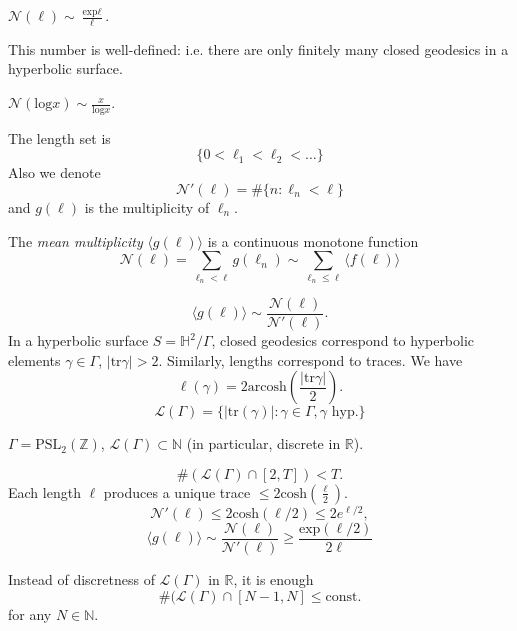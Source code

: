 \begin{theorem}
\label{theorem-huber-selberg}
$\mathcal{N}(\ell)
\sim \frac{\text{exp}\ell}{\ell}$.
\end{theorem}

\noindent
This number is well-defined: i.e.
there are only finitely many closed
geodesics in a hyperbolic surface.

\begin{remark}
\label{remark-nlog}
$\mathcal{N}(\text{log} x)
\sim \frac{x}{\text{log} x}$.
\end{remark}

\noindent
The length set is
$$
\{0<\ell_1<\ell_2<…\}
$$
Also we denote
$$
\mathcal{N}'(\ell)
=\#\{n : \ell_n <\ell\}
$$
and $g(\ell)$ is the multiplicity of
$\ell_n$.

\begin{definition}
\label{definition-mean-multiplicity}
The {\it mean multiplicity} 
$\langle g(\ell)\rangle$ is a continuous
monotone function
$$
\mathcal{N}(\ell)
=\sum_{\ell_n<\ell}g(\ell_n)
\sim
\sum_{\ell_n \leq  \ell}
\langle f(\ell)\rangle
$$
\end{definition}

$$
\langle g(\ell)\rangle
\sim
\frac{\mathcal{N}(\ell)}{\mathcal{N}'
(\ell)}.
$$
\medskip\noindent
In a hyperbolic surface
$S = \mathbb{H}^2/\Gamma$,
closed geodesics correspond to
hyperbolic elements $\gamma \in \Gamma$,
$|\text{tr}\gamma|>2$.
Similarly, lengths correspond to traces.
We have
$$
\ell(\gamma)
=2 \text{arcosh}
\left(\frac{|\text{tr}\gamma|}{2}\right).
$$
$$
\mathcal{L}(\Gamma)
=\{|\text{tr}(\gamma)|:\gamma \in \Gamma,
\gamma\text{ hyp.}\}
$$
\begin{example}
\label{example-modular-group}
$\Gamma = \text{PSL}_2(\mathbb{Z})$,
$\mathcal{L}(\Gamma) \subset \mathbb{N}$
(in particular, discrete in $\mathbb{R}$).
\end{example}

$$
\#(\mathcal{L}(\Gamma)
\cap[2,T])<T.
$$
Each length $\ell$
produces a unique trace
$\leq  2 \text{cosh}\left(\frac{\ell}{2}
\right)$.
$$
\mathcal{N}'(\ell)
\leq 2 \text{cosh}(\ell/2)\leq 2e^{\ell/2},
$$
$$
\langle g(\ell)\rangle
\sim\frac{\mathcal{N}(\ell)}{
\mathcal{N}'(\ell)}
\geq \frac{\text{exp}(\ell/2)}{2\ell}
$$

\begin{theorem}
\label{theorem-luo-sarnak}
Instead of discretness
of $\mathcal{L}(\Gamma)$ in $\mathbb{R}$,
it is enough
$$
\# (\mathcal{L}(\Gamma)
\cap [N-1,N]
\leq \text{const.}
$$
for any $N \in \mathbb{N}$.
\end{theorem}

